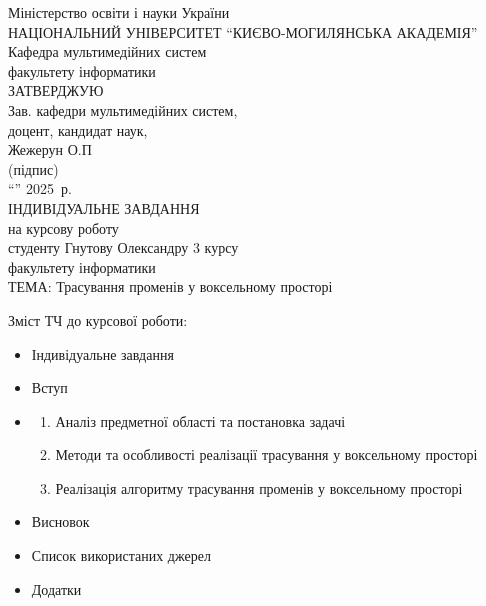 \begin{center}
    {\large Міністерство освіти і науки України}\\[1em]
    {\large НАЦІОНАЛЬНИЙ УНІВЕРСИТЕТ ``КИЄВО-МОГИЛЯНСЬКА АКАДЕМІЯ''}\\[0em]
    {\large Кафедра мультимедійних систем\\факультету інформатики}\\[2em]

    {\large ЗАТВЕРДЖУЮ}\\
    {\large Зав. кафедри мультимедійних систем,}\\
    {\large доцент, кандидат наук,}\\
    {\large \underline{\hspace{3cm}} Жежерун О.П}\\
    {\mbox{\large (підпис) \hspace{4cm}}}\\
    ``\underline{\hspace{1cm}}'' \underline{\hspace{3cm}} 2025~р.\\[2em]
    
    {\large ІНДИВІДУАЛЬНЕ ЗАВДАННЯ}\\[0.5em]
    {\large на курсову роботу}\\[0.5em]
    студенту Гнутову Олександру 3 курсу\\факультету інформатики\\[0.5em]
    
    ТЕМА: Трасування променів у воксельному просторі\\[1em]
    
    \begin{flushleft}
        Зміст ТЧ до курсової роботи:
        \begin{itemize}[itemsep=0pt, topsep=0pt, label={}, leftmargin=18pt]
            \item Індивідуальне завдання
            \item Вступ
            \item \begin{enumerate}
                \item Аналіз предметної області та постановка задачі
                \item Методи та особливості реалізації трасування у воксельному просторі
                \item Реалізація алгоритму трасування променів у воксельному просторі
            \end{enumerate}
            \item Висновок
            \item Список використаних джерел
            \item Додатки
        \end{itemize}
        \vspace{0.5em}


\end{flushleft}
\end{center}
